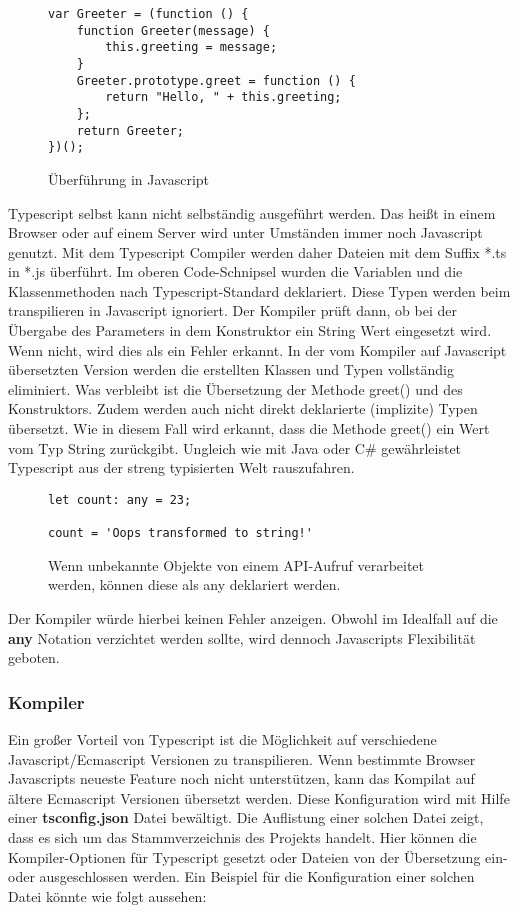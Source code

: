 \begin{figure}[H]
\begin{lstlisting}[basicstyle=\small]
var Greeter = (function () {
    function Greeter(message) {
        this.greeting = message;
    }
    Greeter.prototype.greet = function () {
        return "Hello, " + this.greeting;
    };
    return Greeter;
})(); 
\end{lstlisting}
\caption{Überführung in Javascript \cite{typescript-example}}
\end{figure}

\noindent
Typescript selbst kann nicht selbständig ausgeführt werden. Das heißt in einem Browser oder auf einem Server wird unter Umständen immer noch Javascript genutzt. Mit dem Typescript Compiler werden daher Dateien mit dem Suffix *.ts in *.js überführt. Im oberen Code-Schnipsel wurden die Variablen und die Klassenmethoden nach Typescript-Standard deklariert. Diese Typen werden beim transpilieren in Javascript ignoriert. Der Kompiler prüft dann, ob bei der Übergabe des Parameters in dem Konstruktor ein String Wert eingesetzt wird. Wenn nicht, wird dies als ein Fehler erkannt. In der vom Kompiler auf Javascript übersetzten Version werden die erstellten Klassen und Typen vollständig eliminiert. Was verbleibt ist die Übersetzung der Methode greet() und des Konstruktors. Zudem werden auch nicht direkt deklarierte (implizite) Typen übersetzt. Wie in diesem Fall wird erkannt, dass die Methode greet() ein Wert vom Typ String zurückgibt. Ungleich wie mit Java oder C\# gewährleistet Typescript aus der streng typisierten Welt rauszufahren.

\begin{figure}[H]
\begin{lstlisting}[basicstyle=\small]
let count: any = 23;

count = 'Oops transformed to string!'
\end{lstlisting}
\caption{Wenn unbekannte Objekte von einem API-Aufruf verarbeitet werden, können diese als any deklariert werden.}
\end{figure}

\noindent
Der Kompiler würde hierbei keinen Fehler anzeigen. Obwohl im Idealfall auf die \textbf{any} Notation verzichtet werden sollte, wird dennoch Javascripts Flexibilität geboten. 

\subsubsection{Kompiler}
Ein großer Vorteil von Typescript ist die Möglichkeit auf verschiedene Javascript/Ecmascript Versionen zu transpilieren. Wenn bestimmte Browser Javascripts neueste Feature noch nicht unterstützen, kann das Kompilat auf ältere Ecmascript Versionen übersetzt werden. Diese Konfiguration wird mit Hilfe einer \textbf{tsconfig.json} Datei bewältigt. Die Auflistung einer solchen Datei zeigt, dass es sich um das Stammverzeichnis des Projekts handelt. Hier können die Kompiler-Optionen für Typescript gesetzt oder Dateien von der Übersetzung ein- oder ausgeschlossen werden. Ein Beispiel für die Konfiguration einer solchen Datei könnte wie folgt aussehen: 

